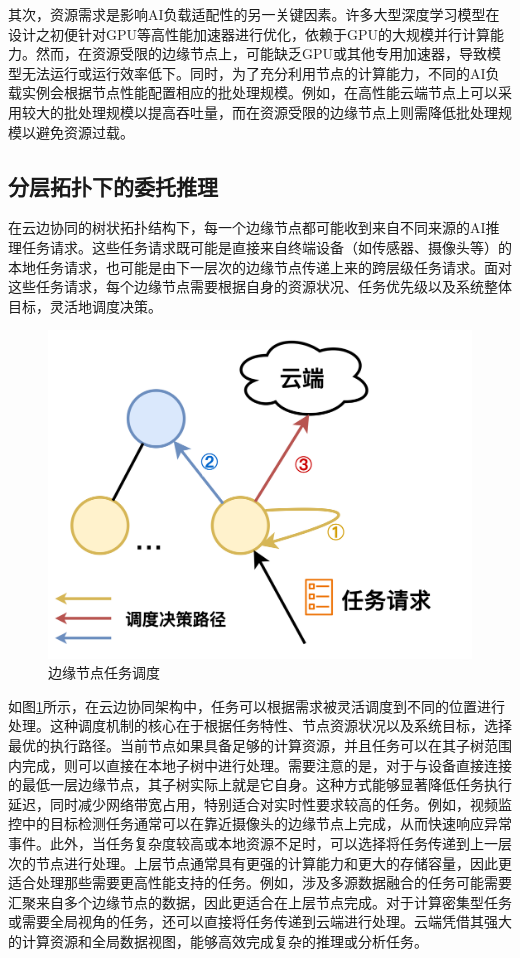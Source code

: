 其次，资源需求是影响AI负载适配性的另一关键因素。许多大型深度学习模型在设计之初便针对GPU等高性能加速器进行优化，依赖于GPU的大规模并行计算能力。然而，在资源受限的边缘节点上，可能缺乏GPU或其他专用加速器，导致模型无法运行或运行效率低下。同时，为了充分利用节点的计算能力，不同的AI负载实例会根据节点性能配置相应的批处理规模。例如，在高性能云端节点上可以采用较大的批处理规模以提高吞吐量，而在资源受限的边缘节点上则需降低批处理规模以避免资源过载。

\subsection{分层拓扑下的委托推理}

在云边协同的树状拓扑结构下，每一个边缘节点都可能收到来自不同来源的AI推理任务请求。这些任务请求既可能是直接来自终端设备（如传感器、摄像头等）的本地任务请求，也可能是由下一层次的边缘节点传递上来的跨层级任务请求。面对这些任务请求，每个边缘节点需要根据自身的资源状况、任务优先级以及系统整体目标，灵活地调度决策。

\begin{figure}[ht]
  \centering
  \includegraphics[width=0.45\linewidth]{pics/3-7节点调度.png}
  \caption{边缘节点任务调度}
  \label{fig:3-7node}
\end{figure}

如图\ref{fig:3-7node}所示，在云边协同架构中，任务可以根据需求被灵活调度到不同的位置进行处理。这种调度机制的核心在于根据任务特性、节点资源状况以及系统目标，选择最优的执行路径。当前节点如果具备足够的计算资源，并且任务可以在其子树范围内完成，则可以直接在本地子树中进行处理。需要注意的是，对于与设备直接连接的最低一层边缘节点，其子树实际上就是它自身。这种方式能够显著降低任务执行延迟，同时减少网络带宽占用，特别适合对实时性要求较高的任务。例如，视频监控中的目标检测任务通常可以在靠近摄像头的边缘节点上完成，从而快速响应异常事件。此外，当任务复杂度较高或本地资源不足时，可以选择将任务传递到上一层次的节点进行处理。上层节点通常具有更强的计算能力和更大的存储容量，因此更适合处理那些需要更高性能支持的任务。例如，涉及多源数据融合的任务可能需要汇聚来自多个边缘节点的数据，因此更适合在上层节点完成。对于计算密集型任务或需要全局视角的任务，还可以直接将任务传递到云端进行处理。云端凭借其强大的计算资源和全局数据视图，能够高效完成复杂的推理或分析任务。

